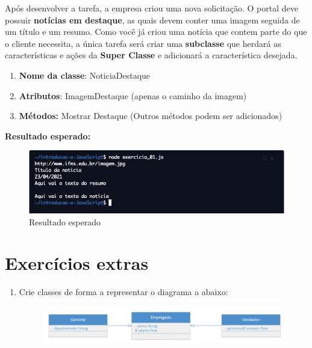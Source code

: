 Após desenvolver a tarefa, a empresa criou uma nova solicitação. O portal deve possuir \textbf{notícias em destaque}, as quais devem conter uma imagem seguida de um título e um resumo. Como você já criou uma notícia que contem parte do que o cliente necessita, a única tarefa será criar uma \textbf{subclasse} que herdará as características e ações da \textbf{Super Classe} e adicionará a característica desejada.

	\begin{enumerate}
	\item \textbf{Nome da classe}: NoticiaDestaque
	\item \textbf{Atributos}: ImagemDestaque (apenas o caminho da imagem)
	\item \textbf{Métodos:} Mostrar Destaque (Outros métodos podem ser adicionados)
\end{enumerate}

\textbf{Resultado esperado:} 

\begin{figure}[H]
	\centering
	\includegraphics[scale=0.5]{imagens/exercicio_heranca.png}
	\caption{Resultado esperado}
	\label{fig:resultado2}
\end{figure}

\section{Exercícios extras}

\begin{enumerate}
	\item Crie classes de forma a representar o diagrama a abaixo:
	
	\begin{figure}[H]
		\centering
		\includegraphics[scale=0.3]{imagens/exercicio-fix-02-01.png}
	\end{figure}
\end{enumerate}



